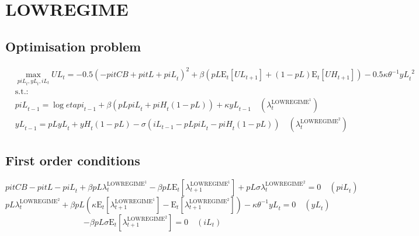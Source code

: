\section{LOWREGIME}

\subsection{Optimisation problem}

\begin{align}
&\max_{{p\!i\!L}_{t}, {y\!L}_{t}, {i\!L}_{t}
} {U\!L}_{t} = -0.5\left(-{p\!i\!t\!C\!B} + {p\!i\!t\!L} + {p\!i\!L}_{t}\right)^{2} + {\beta} \left({{p\!L}} {\mathrm{E}_{t}\left[{U\!L}_{t+1}\right]} + \left(1 - {p\!L}\right) {\mathrm{E}_{t}\left[{U\!H}_{t+1}\right]}\right) - 0.5{\kappa} {\theta}^{-1} {{y\!L}_{t}}^{2}\\
&\mathrm{s.t.:}\nonumber\\
& {p\!i\!L}_{t-1} = \log{{e\!t\!a\!p\!i}_{t-1}} + {\beta} \left({{p\!L}} {{p\!i\!L}_{t}} + {{p\!i\!H}_{t}} \left(1 - {p\!L}\right)\right) + {\kappa} {{y\!L}_{t-1}} \quad \left(\lambda^{\mathrm{LOWREGIME}^{\mathrm{1}}}_{t}\right)\\
& {y\!L}_{t-1} = {{p\!L}} {{y\!L}_{t}} + {{y\!H}_{t}} \left(1 - {p\!L}\right) - {\sigma} \left({i\!L}_{t-1} - {{p\!L}} {{p\!i\!L}_{t}} - {{p\!i\!H}_{t}} \left(1 - {p\!L}\right)\right) \quad \left(\lambda^{\mathrm{LOWREGIME}^{\mathrm{2}}}_{t}\right)
\end{align}


\subsection{First order conditions}

\begin{equation}
{p\!i\!t\!C\!B} - {p\!i\!t\!L} - {p\!i\!L}_{t} + {\beta} {{p\!L}} {\lambda^{\mathrm{LOWREGIME}^{\mathrm{1}}}_{t}} - {\beta} {{p\!L}} {\mathrm{E}_{t}\left[\lambda^{\mathrm{LOWREGIME}^{\mathrm{1}}}_{t+1}\right]} + {{p\!L}} {\sigma} {\lambda^{\mathrm{LOWREGIME}^{\mathrm{2}}}_{t}} = 0
 \quad \left({p\!i\!L}_{t}\right)
\end{equation}
\begin{equation}
{{p\!L}} {\lambda^{\mathrm{LOWREGIME}^{\mathrm{2}}}_{t}} + {\beta} {{p\!L}} \left({\kappa} {\mathrm{E}_{t}\left[\lambda^{\mathrm{LOWREGIME}^{\mathrm{1}}}_{t+1}\right]} - \mathrm{E}_{t}\left[\lambda^{\mathrm{LOWREGIME}^{\mathrm{2}}}_{t+1}\right]\right) - {\kappa} {\theta}^{-1} {{y\!L}_{t}} = 0
 \quad \left({y\!L}_{t}\right)
\end{equation}
\begin{equation}
-{\beta} {{p\!L}} {\sigma} {\mathrm{E}_{t}\left[\lambda^{\mathrm{LOWREGIME}^{\mathrm{2}}}_{t+1}\right]} = 0
 \quad \left({i\!L}_{t}\right)
\end{equation}




